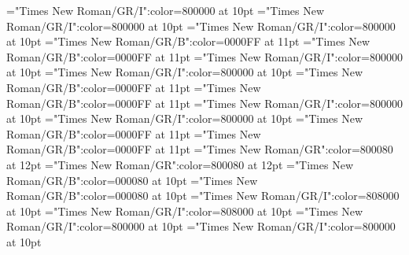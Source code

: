 \documentclass[a4paper,twoside]{article}
\begin{document}
\font\spancommentminorentryvariant="Times New Roman/GR/I":color=800000 at 10pt
\font\spanesabbreviationvariantentrytypevariantentrytypesvariantformentrybackrefsminorentryvariant="Times New Roman/GR/I":color=800000 at 10pt
\font\spanabbreviationvariantentrytypevariantentrytypesvariantformentrybackrefsminorentryvariant="Times New Roman/GR/I":color=800000 at 10pt
\font\spanmxbheadwordvariantformentrybackrefvariantformentrybackrefsminorentryvariant="Times New Roman/GR/B":color=0000FF at 11pt
\font\spanheadwordvariantformentrybackrefvariantformentrybackrefsminorentryvariant="Times New Roman/GR/B":color=0000FF at 11pt
\font\spanesabbreviationvariantentrytypevariantentrytypesvariantformentrybackrefsbminorentryvariant="Times New Roman/GR/I":color=800000 at 10pt
\font\spanabbreviationvariantentrytypevariantentrytypesvariantformentrybackrefsbminorentryvariant="Times New Roman/GR/I":color=800000 at 10pt
\font\spanmxbheadwordvariantformentrybackrefbvariantformentrybackrefsbminorentryvariant="Times New Roman/GR/B":color=0000FF at 11pt
\font\spanheadwordvariantformentrybackrefbvariantformentrybackrefsbminorentryvariant="Times New Roman/GR/B":color=0000FF at 11pt
\font\spanesownertypeabbreviationminimallexreferenceminimallexreferencesminorentryvariant="Times New Roman/GR/I":color=800000 at 10pt
\font\spanownertypeabbreviationminimallexreferenceminimallexreferencesminorentryvariant="Times New Roman/GR/I":color=800000 at 10pt
\font\spanmxbheadwordconfigtargetconfigtargetsminimallexreferenceminimallexreferencesminorentryvariant="Times New Roman/GR/B":color=0000FF at 11pt
\font\spanheadwordconfigtargetconfigtargetsminimallexreferenceminimallexreferencesminorentryvariant="Times New Roman/GR/B":color=0000FF at 11pt
\font\spanesliteralmeaningminorentryvariant="Times New Roman/GR":color=800080 at 12pt
\font\spanliteralmeaningminorentryvariant="Times New Roman/GR":color=800080 at 12pt
\font\spanmxbexampleexamplescontentsmainentrysubsenses="Times New Roman/GR/B":color=000080 at 10pt
\font\spanexampleexamplescontentsmainentrysubsenses="Times New Roman/GR/B":color=000080 at 10pt
\font\spanesownertypeabbreviationlexsensereferencelexsensereferencesmainentrysubsenses="Times New Roman/GR/I":color=808000 at 10pt
\font\spanownertypeabbreviationlexsensereferencelexsensereferencesmainentrysubsenses="Times New Roman/GR/I":color=808000 at 10pt
\font\spanmxbheadwordconfigtargetconfigtargetslexsensereferencelexsensereferencesmainentrysubsenses="Times New Roman/GR/I":color=800000 at 10pt
\font\spanheadwordconfigtargetconfigtargetslexsensereferencelexsensereferencesmainentrysubsenses="Times New Roman/GR/I":color=800000 at 10pt
\end{document}
